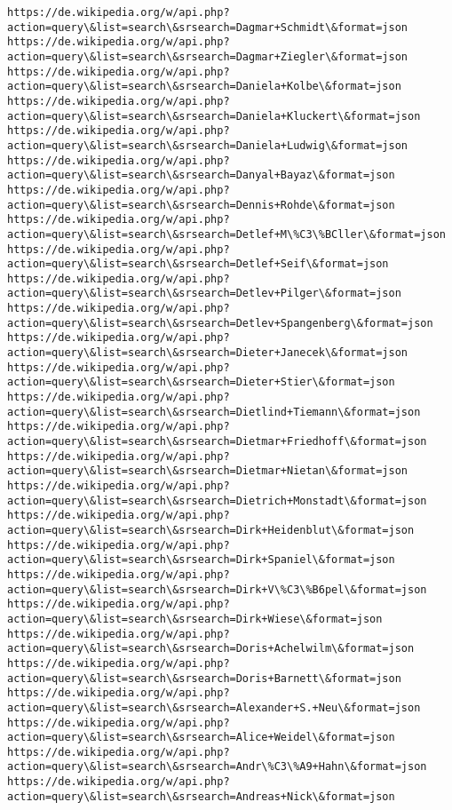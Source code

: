 \documentclass[11pt]{article}
\begin{document}
\begin{Verbatim}[commandchars=\\\{\}]
https://de.wikipedia.org/w/api.php?action=query\&list=search\&srsearch=Dagmar+Schmidt\&format=json
https://de.wikipedia.org/w/api.php?action=query\&list=search\&srsearch=Dagmar+Ziegler\&format=json
https://de.wikipedia.org/w/api.php?action=query\&list=search\&srsearch=Daniela+Kolbe\&format=json
https://de.wikipedia.org/w/api.php?action=query\&list=search\&srsearch=Daniela+Kluckert\&format=json
https://de.wikipedia.org/w/api.php?action=query\&list=search\&srsearch=Daniela+Ludwig\&format=json
https://de.wikipedia.org/w/api.php?action=query\&list=search\&srsearch=Danyal+Bayaz\&format=json
https://de.wikipedia.org/w/api.php?action=query\&list=search\&srsearch=Dennis+Rohde\&format=json
https://de.wikipedia.org/w/api.php?action=query\&list=search\&srsearch=Detlef+M\%C3\%BCller\&format=json
https://de.wikipedia.org/w/api.php?action=query\&list=search\&srsearch=Detlef+Seif\&format=json
https://de.wikipedia.org/w/api.php?action=query\&list=search\&srsearch=Detlev+Pilger\&format=json
https://de.wikipedia.org/w/api.php?action=query\&list=search\&srsearch=Detlev+Spangenberg\&format=json
https://de.wikipedia.org/w/api.php?action=query\&list=search\&srsearch=Dieter+Janecek\&format=json
https://de.wikipedia.org/w/api.php?action=query\&list=search\&srsearch=Dieter+Stier\&format=json
https://de.wikipedia.org/w/api.php?action=query\&list=search\&srsearch=Dietlind+Tiemann\&format=json
https://de.wikipedia.org/w/api.php?action=query\&list=search\&srsearch=Dietmar+Friedhoff\&format=json
https://de.wikipedia.org/w/api.php?action=query\&list=search\&srsearch=Dietmar+Nietan\&format=json
https://de.wikipedia.org/w/api.php?action=query\&list=search\&srsearch=Dietrich+Monstadt\&format=json
https://de.wikipedia.org/w/api.php?action=query\&list=search\&srsearch=Dirk+Heidenblut\&format=json
https://de.wikipedia.org/w/api.php?action=query\&list=search\&srsearch=Dirk+Spaniel\&format=json
https://de.wikipedia.org/w/api.php?action=query\&list=search\&srsearch=Dirk+V\%C3\%B6pel\&format=json
https://de.wikipedia.org/w/api.php?action=query\&list=search\&srsearch=Dirk+Wiese\&format=json
https://de.wikipedia.org/w/api.php?action=query\&list=search\&srsearch=Doris+Achelwilm\&format=json
https://de.wikipedia.org/w/api.php?action=query\&list=search\&srsearch=Doris+Barnett\&format=json
https://de.wikipedia.org/w/api.php?action=query\&list=search\&srsearch=Alexander+S.+Neu\&format=json
https://de.wikipedia.org/w/api.php?action=query\&list=search\&srsearch=Alice+Weidel\&format=json
https://de.wikipedia.org/w/api.php?action=query\&list=search\&srsearch=Andr\%C3\%A9+Hahn\&format=json
https://de.wikipedia.org/w/api.php?action=query\&list=search\&srsearch=Andreas+Nick\&format=json

\end{Verbatim}
\end{document}
